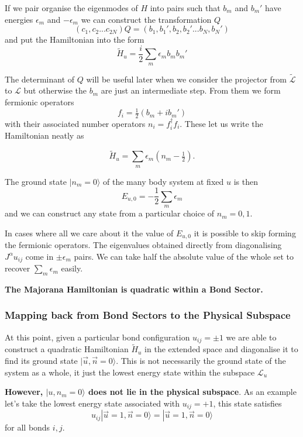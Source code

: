 If we pair organise the eigenmodes of \(H\) into pairs such that \(b_m\)
and \(b_m'\) have energies \(\epsilon_m\) and \(-\epsilon_m\) we can
construct the transformation \(Q\)
\[(c_1, c_2... c_{2N}) Q = (b_1, b_1', b_2, b_2' ... b_{N}, b_{N}')\]
and put the Hamiltonian into the form
\[\tilde{H}_u = \frac{i}{2} \sum_m \epsilon_m b_m b_m'\]

The determinant of \(Q\) will be useful later when we consider the
projector from \(\mathcal{\tilde{L}}\) to \(\mathcal{L}\) but otherwise
the \(b_m\) are just an intermediate step. From them we form fermionic
operators \[ f_i = \tfrac{1}{2} (b_m + ib_m')\] with their associated
number operators \(n_i = f^\dagger_i f_i\). These let us write the
Hamiltonian neatly as

\[ \tilde{H}_u = \sum_m \epsilon_m (n_m - \tfrac{1}{2}).\]

The ground state \(|n_m = 0\rangle\) of the many body system at fixed
\(u\) is then \[E_{u,0} = -\frac{1}{2}\sum_m \epsilon_m \] and we can
construct any state from a particular choice of \(n_m = 0,1\).

In cases where all we care about it the value of \(E_{u,0}\) it is
possible to skip forming the fermionic operators. The eigenvalues
obtained directly from diagonalising \(J^{\alpha} u_{ij}\) come in
\(\pm \epsilon_m\) pairs. We can take half the absolute value of the
whole set to recover \(\sum_m \epsilon_m\) easily.

\textbf{The Majorana Hamiltonian is quadratic within a Bond Sector.}

\hypertarget{mapping-back-from-bond-sectors-to-the-physical-subspace}{%
\subsubsection{Mapping back from Bond Sectors to the Physical
Subspace}\label{mapping-back-from-bond-sectors-to-the-physical-subspace}}

At this point, given a particular bond configuration \(u_{ij} = \pm 1\)
we are able to construct a quadratic Hamiltonian \(\tilde{H}_u\) in the
extended space and diagonalise it to find its ground state
\(|\vec{u}, \vec{n} = 0\rangle\). This is not necessarily the ground
state of the system as a whole, it just the lowest energy state within
the subspace \(\mathcal{L}_u\)

\textbf{However, \(|u, n_m = 0\rangle\) does not lie in the physical
subspace}. As an example let's take the lowest energy state associated
with \(u_{ij} = +1\), this state satisfies
\[u_{ij} |\vec{u}=1, \vec{n} = 0\rangle = |\vec{u}=1, \vec{n} = 0\rangle\]
for all bonds \(i,j\).

